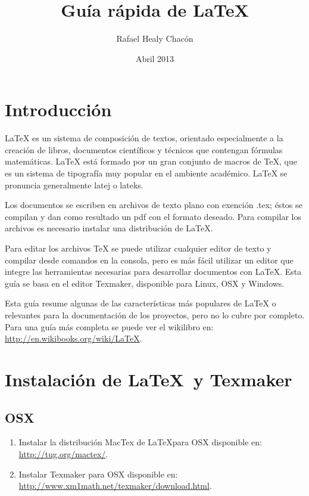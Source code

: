 \documentclass[12pt, a4paper,twoside]{article} %
\title{Guía rápida de \LaTeX}
\author{Rafael Healy Chacón}
\date{Abril 2013}
\begin{document}
\lstset{language=TeX}
\maketitle

\tableofcontents

\clearpage 
\section{Introducción}
LaTeX es un sistema de composición de textos, orientado especialmente a la creación de libros, documentos científicos y técnicos que contengan fórmulas matemáticas. LaTeX está formado por un gran conjunto de macros de TeX, que es un sistema de tipografía muy popular en el ambiente académico. LaTeX se pronuncia generalmente latej o lateks.

Los documentos se escriben en archivos de texto plano con exención .tex; éstos se compilan y dan como resultado un pdf con el formato deseado. Para compilar los archivos es necesario instalar una distribución de LaTeX. 

Para editar los archivos TeX se puede utilizar cualquier editor de texto y compilar desde comandos en la consola, pero es más fácil utilizar un editor que integre las herramientas necesarias para desarrollar documentos con LaTeX. Esta guía se basa en el editor Texmaker, disponible para Linux, OSX y Windows.

Esta guía resume algunas de las características más populares de LaTeX o relevantes para la documentación de los proyectos, pero no lo cubre por completo. Para una guía más completa se puede ver el wikilibro en: \url{http://en.wikibooks.org/wiki/LaTeX}.

\section{Instalación de \LaTeX \ y Texmaker}

\subsection{OSX}
\begin{enumerate}
\item Instalar la distribución MacTex de \LaTeX para OSX disponible en: \url{http://tug.org/mactex/}.
\item Instalar Texmaker para OSX disponible en: \url{http://www.xm1math.net/texmaker/download.html}.
\end{enumerate}
\end{document}
